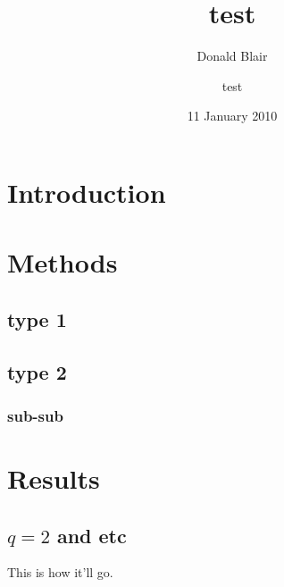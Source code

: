 \documentclass[pre,preprint,11pt]{revtex4}
\author{Donald Blair}
\date{11 January 2010}
\begin{document}
\author{test}
\title{test}
\maketitle

\section{Introduction}
\label{sec-1}

\section{Methods}
\label{sec-2}

\subsection{type 1}
\label{sec-2.1}

\subsection{type 2}
\label{sec-2.2}

\subsubsection{sub-sub}
\label{sec-2.2.1}

\section{Results}
\label{sec-3}

\subsection{$q=2$ and etc}
\label{sec-3.1}

This is how it'll go.



\end{document}
